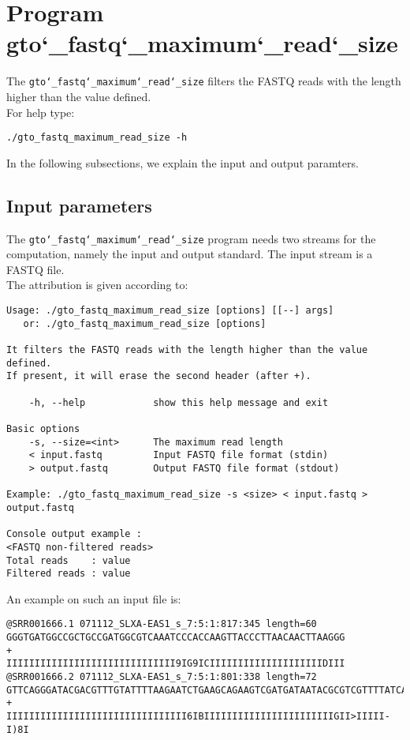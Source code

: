 \section{Program gto\char`_fastq\char`_maximum\char`_read\char`_size}
The \texttt{gto\char`_fastq\char`_maximum\char`_read\char`_size} filters the FASTQ reads with the length higher than the value defined.\\
For help type:
\begin{lstlisting}
./gto_fastq_maximum_read_size -h
\end{lstlisting}
In the following subsections, we explain the input and output paramters.

\subsection*{Input parameters}

The \texttt{gto\char`_fastq\char`_maximum\char`_read\char`_size} program needs two streams for the computation, namely the input and output standard. The input stream is a FASTQ file.\\
The attribution is given according to:
\begin{lstlisting}
Usage: ./gto_fastq_maximum_read_size [options] [[--] args]
   or: ./gto_fastq_maximum_read_size [options]

It filters the FASTQ reads with the length higher than the value defined. 
If present, it will erase the second header (after +).

    -h, --help            show this help message and exit

Basic options
    -s, --size=<int>      The maximum read length
    < input.fastq         Input FASTQ file format (stdin)
    > output.fastq        Output FASTQ file format (stdout)

Example: ./gto_fastq_maximum_read_size -s <size> < input.fastq > output.fastq

Console output example :
<FASTQ non-filtered reads>
Total reads    : value
Filtered reads : value
\end{lstlisting}
An example on such an input file is:
\begin{lstlisting}
@SRR001666.1 071112_SLXA-EAS1_s_7:5:1:817:345 length=60
GGGTGATGGCCGCTGCCGATGGCGTCAAATCCCACCAAGTTACCCTTAACAACTTAAGGG
+
IIIIIIIIIIIIIIIIIIIIIIIIIIIIII9IG9ICIIIIIIIIIIIIIIIIIIIIDIII
@SRR001666.2 071112_SLXA-EAS1_s_7:5:1:801:338 length=72
GTTCAGGGATACGACGTTTGTATTTTAAGAATCTGAAGCAGAAGTCGATGATAATACGCGTCGTTTTATCAT
+
IIIIIIIIIIIIIIIIIIIIIIIIIIIIIIII6IBIIIIIIIIIIIIIIIIIIIIIIIGII>IIIII-I)8I
\end{lstlisting}

